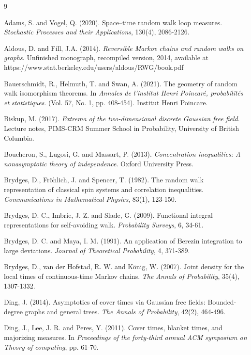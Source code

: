 \documentclass[a4paper, 11pt]{article}
\begin{document}
\begin{thebibliography}{9}

  Adams, S. and  Vogel, Q. (2020). Space–time random walk loop measures. {\em Stochastic Processes and their Applications}, 130(4), 2086-2126.

Aldous, D. and Fill, J.A. (2014).
{\em Reversible Markov chains and random walks on graphs}. Unfinished monograph, recompiled version, 2014,
available at
https://www.stat.berkeley.edu/users/aldous/RWG/book.pdf

  Bauerschmidt, R., Helmuth, T. and Swan, A. (2021). The geometry of random walk isomorphism theorems. In {\em Annales de l'institut Henri Poincaré, probabilités et statistiques}. (Vol. 57, No. 1, pp. 408-454). Institut Henri Poincare.

  Biskup, M. (2017). {\em Extrema of the two-dimensional discrete Gaussian free field}. Lecture notes, PIMS-CRM Summer School in Probability, University of British Columbia.

  Boucheron, S., Lugosi, G. and Massart, P. (2013). {\em Concentration inequalities: A nonasymptotic theory of independence}. Oxford University Press.

  Brydges, D., Fröhlich, J. and Spencer, T. (1982). The random walk representation of classical spin systems and correlation inequalities. {\em Communications in Mathematical Physics}, 83(1), 123-150.

  Brydges, D. C., Imbrie, J. Z. and Slade, G. (2009). Functional integral representations for self-avoiding walk. {\em Probability Surveys}, 6, 34-61.

  Brydges, D. C. and Maya, I. M. (1991). An application of Berezin integration to large deviations. {\em Journal of Theoretical Probability}, 4, 371-389.

  Brydges, D., van der Hofstad, R. W. and König, W. (2007). Joint density for the local times of continuous-time Markov chains. {\em The Annals of Probability}, 35(4), 1307-1332.

  Ding, J. (2014). Asymptotics of cover times via Gaussian free fields: Bounded-degree graphs and general trees. {\em The Annals of Probability}, 42(2), 464-496.

  Ding, J., Lee, J. R. and Peres, Y. (2011). Cover times, blanket times, and majorizing measures. In {\em Proceedings of the forty-third annual ACM symposium on Theory of computing}, pp. 61-70.


\end{thebibliography}
\end{document}
